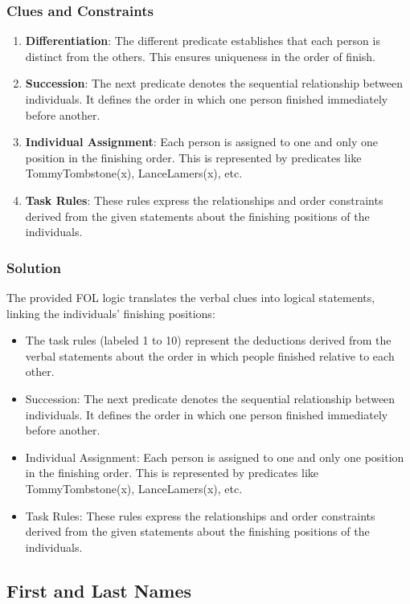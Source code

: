\documentclass[a4paper,12pt]{report}
\begin{document}
\subsubsection{Clues and Constraints}
\begin{enumerate}
\item  \textbf{Differentiation}: The different predicate establishes that each person is distinct from the others. This ensures uniqueness in the order of finish.
\item \textbf{Succession}: The next predicate denotes the sequential relationship between individuals. It defines the order in which one person finished immediately before another.
\item  \textbf{Individual Assignment}: Each person is assigned to one and only one position in the finishing order. This is represented by predicates like TommyTombstone(x), LanceLamers(x), etc.
\item \textbf{Task Rules}: These rules express the relationships and order constraints derived from the given statements about the finishing positions of the individuals.
\end{enumerate}

\subsubsection{Solution}

The provided FOL logic translates the verbal clues into logical statements, linking the individuals' finishing positions:
\begin{itemize}
    \item The task rules (labeled 1 to 10) represent the deductions derived from the verbal statements about the order in which people finished relative to each other.
    \item Succession: The next predicate denotes the sequential relationship between individuals. It defines the order in which one person finished immediately before another.
    \item Individual Assignment: Each person is assigned to one and only one position in the finishing order. This is represented by predicates like TommyTombstone(x), LanceLamers(x), etc. 
    \item Task Rules: These rules express the relationships and order constraints derived from the given statements about the finishing positions of the individuals.
\end{itemize}

\subsection{First and Last Names}
\end{document}
